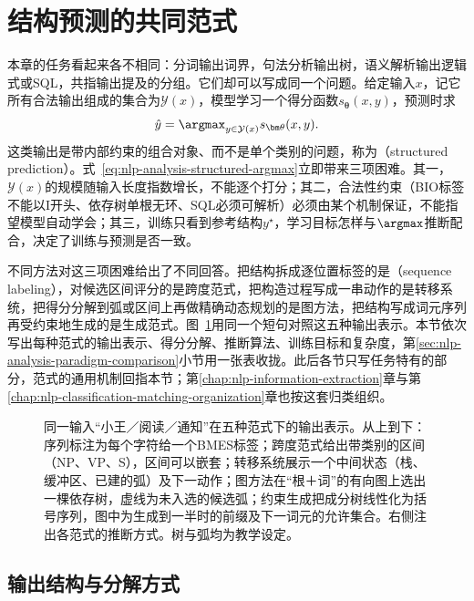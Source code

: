 \section{结构预测的共同范式}
\label{sec:nlp-analysis-paradigms}

本章的任务看起来各不相同：分词输出词界，句法分析输出树，语义解析输出逻辑式或SQL，共指输出提及的分组。它们却可以写成同一个问题。给定输入$x$，记它所有合法输出组成的集合为$\mathcal{Y}(x)$，模型学习一个得分函数$s_{\bm\theta}(x,y)$，预测时求
\begin{equation}
  \hat y=\argmax_{y\in\mathcal{Y}(x)}s_{\bm\theta}(x,y).
  \label{eq:nlp-analysis-structured-argmax}
\end{equation}
这类输出是带内部约束的组合对象、而不是单个类别的问题，称为（structured prediction）。式~\eqref{eq:nlp-analysis-structured-argmax}立即带来三项困难。其一，$\mathcal{Y}(x)$的规模随输入长度指数增长，不能逐个打分；其二，合法性约束（BIO标签不能以I开头、依存树单根无环、SQL必须可解析）必须由某个机制保证，不能指望模型自动学会；其三，训练只看到参考结构$y^\star$，学习目标怎样与$\argmax$推断配合，决定了训练与预测是否一致。

不同方法对这三项困难给出了不同回答。把结构拆成逐位置标签的是（sequence labeling），对候选区间评分的是跨度范式，把构造过程写成一串动作的是转移系统，把得分分解到弧或区间上再做精确动态规划的是图方法，把结构写成词元序列再受约束地生成的是生成范式。图~\ref{fig:nlp-analysis-paradigms}用同一个短句对照这五种输出表示。本节依次写出每种范式的输出表示、得分分解、推断算法、训练目标和复杂度，第\ref{sec:nlp-analysis-paradigm-comparison}小节用一张表收拢。此后各节只写任务特有的部分，范式的通用机制回指本节；第\ref{chap:nlp-information-extraction}章与第\ref{chap:nlp-classification-matching-organization}章也按这套归类组织。

\begin{figure}[htbp]
  \centering
  
  \caption{同一输入“小王／阅读／通知”在五种范式下的输出表示。从上到下：序列标注为每个字符给一个BMES标签；跨度范式给出带类别的区间（NP、VP、S），区间可以嵌套；转移系统展示一个中间状态（栈、缓冲区、已建的弧）及下一动作；图方法在“根＋词”的有向图上选出一棵依存树，虚线为未入选的候选弧；约束生成把成分树线性化为括号序列，图中为生成到一半时的前缀及下一词元的允许集合。右侧注出各范式的推断方式。树与弧均为教学设定。}
  \label{fig:nlp-analysis-paradigms}
\end{figure}

\subsection{输出结构与分解方式}
\label{sec:nlp-analysis-paradigm-structures}

